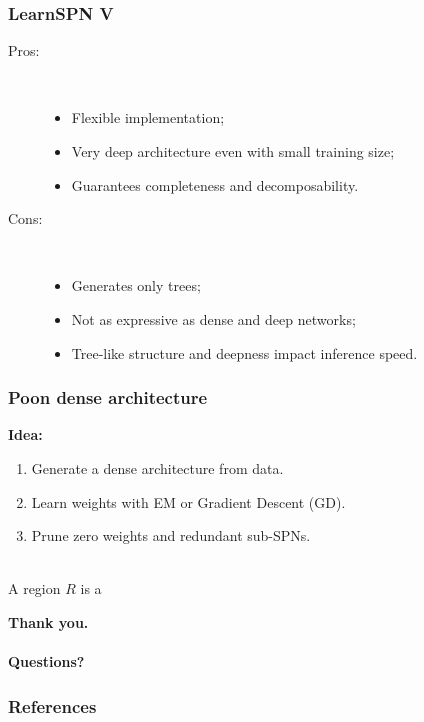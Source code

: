 \documentclass{beamer}
\begin{document}
\begin{frame}
  \frametitle{LearnSPN V}

  \begin{description}
    \item[Pros:]~\\
      \begin{itemize}
        \item Flexible implementation;
        \item Very deep architecture even with small training size;
        \item Guarantees completeness and decomposability.
      \end{itemize}
    \item[Cons:]~\\
      \begin{itemize}
        \item Generates only trees;
        \item Not as expressive as dense and deep networks;
        \item Tree-like structure and deepness impact inference speed.
      \end{itemize}
  \end{description}
\end{frame}

\begin{frame}
  \frametitle{Poon dense architecture}

  \textbf{Idea:}
  \begin{enumerate}
    \item Generate a dense architecture from data.
    \item Learn weights with EM or Gradient Descent (GD).
    \item Prune zero weights and redundant sub-SPNs.
  \end{enumerate}

  \begin{definition}[Region]~\\
    A region $R$ is a
  \end{definition}
\end{frame}


\begin{frame}[standout]
  \textbf{Thank you.\\~\\Questions?}
\end{frame}

\begin{frame}[t,allowframebreaks]
  \frametitle{References}
  \printbibliography[heading=none]
\end{frame}
\end{document}
